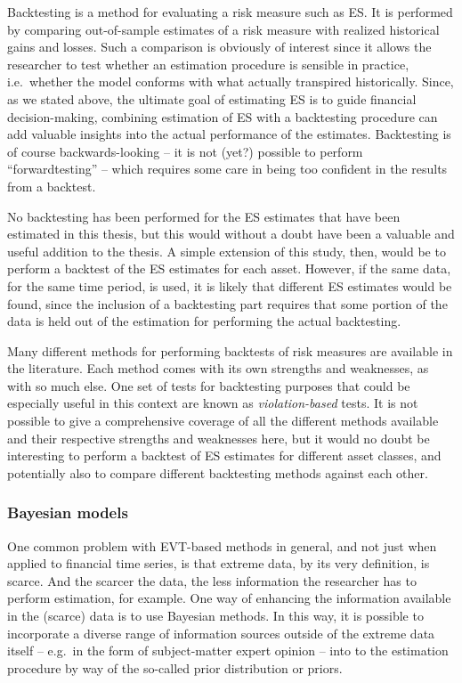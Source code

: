 \documentclass[a4paper,11pt]{article}
\theoremstyle{definition}
\theoremstyle{definition}
\theoremstyle{definition}
\theoremstyle{definition}
\theoremstyle{remark}
\begin{document}
Backtesting is a method for evaluating a risk measure such as ES. It is performed by comparing out-of-sample estimates of a risk measure with realized historical gains and losses. Such a comparison is obviously of interest since it allows the researcher to test whether an estimation procedure is sensible in practice, i.e.~whether the model conforms with what actually transpired historically. Since, as we stated above, the ultimate goal of estimating ES is to guide financial decision-making, combining estimation of ES with a backtesting procedure can add valuable insights into the actual performance of the estimates. Backtesting is of course backwards-looking -- it is not (yet?) possible to perform ``forwardtesting'' -- which requires some care in being too confident in the results from a backtest.

No backtesting has been performed for the ES estimates that have been estimated in this thesis, but this would without a doubt have been a valuable and useful addition to the thesis. A simple extension of this study, then, would be to perform a backtest of the ES estimates for each asset. However, if the same data, for the same time period, is used, it is likely that different ES estimates would be found, since the inclusion of a backtesting part requires that some portion of the data is held out of the estimation for performing the actual backtesting.

Many different methods for performing backtests of risk measures are available in the literature. Each method comes with its own strengths and weaknesses, as with so much else. One set of tests for backtesting purposes that could be especially useful in this context are known as \emph{violation-based} tests. It is not possible to give a comprehensive coverage of all the different methods available and their respective strengths and weaknesses here, but it would no doubt be interesting to perform a backtest of ES estimates for different asset classes, and potentially also to compare different backtesting methods against each other.

\newpage

\hypertarget{bayesian-models}{%
\subsubsection{Bayesian models}\label{bayesian-models}}

One common problem with EVT-based methods in general, and not just when applied to financial time series, is that extreme data, by its very definition, is scarce. And the scarcer the data, the less information the researcher has to perform estimation, for example. One way of enhancing the information available in the (scarce) data is to use Bayesian methods. In this way, it is possible to incorporate a diverse range of information sources outside of the extreme data itself -- e.g.~in the form of subject-matter expert opinion -- into to the estimation procedure by way of the so-called prior distribution or priors.
\end{document}
